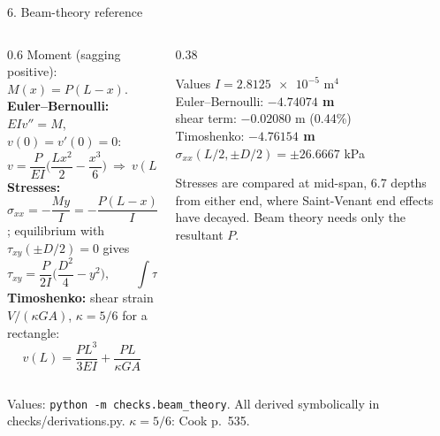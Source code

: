 \documentclass[aspectratio=169,10pt]{beamer}
\newcommand{\src}[1]{{\color{muted}\scriptsize #1}}
\begin{document}
\begin{frame}{6. Beam-theory reference}
  \begin{columns}[T]
    \begin{column}{0.6\textwidth}
      Moment (sagging positive): $M(x)=P(L-x)$.\\[3pt]
      \textbf{Euler--Bernoulli:} $EIv''=M$, $v(0)=v'(0)=0$:
      \[
        v=\frac{P}{EI}\Big(\frac{Lx^2}{2}-\frac{x^3}{6}\Big)\ \Rightarrow\ v(L)=\frac{PL^3}{3EI},
        \qquad I=\frac{tD^3}{12}
      \]
      \textbf{Stresses:} $\sigma_{xx}=-\dfrac{My}{I}=-\dfrac{P(L-x)\,y}{I}$; equilibrium with $\tau_{xy}(\pm D/2)=0$ gives
      \[
        \tau_{xy}=\frac{P}{2I}\Big(\frac{D^2}{4}-y^2\Big),\qquad\int\tau_{xy}\,t\,dy=P
      \]
      \textbf{Timoshenko:} shear strain $V/(\kappa GA)$, $\kappa=5/6$ for a rectangle:
      \[
        v(L)=\frac{PL^3}{3EI}+\frac{PL}{\kappa GA}
      \]
    \end{column}
    \begin{column}{0.38\textwidth}
      \begin{block}{Values}
        $I=\num{2.8125e-5}$ m$^4$\\
        Euler--Bernoulli: \textbf{$-4.74074$ \textmu m}\\
        shear term: $-0.02080$ \textmu m (0.44\%)\\
        Timoshenko: \textbf{$-4.76154$ \textmu m}\\
        $\sigma_{xx}(L/2,\pm D/2)=\pm26.6667$ kPa
      \end{block}
      \small
      Stresses are compared at mid-span, 6.7 depths from either end, where Saint-Venant end effects have
      decayed. Beam theory needs only the resultant $P$.
    \end{column}
  \end{columns}
  \vfill
  \src{Values: \texttt{python -m checks.beam\_theory}. All derived symbolically in checks/derivations.py. $\kappa=5/6$: Cook p.~535.}
\end{frame}
\end{document}
